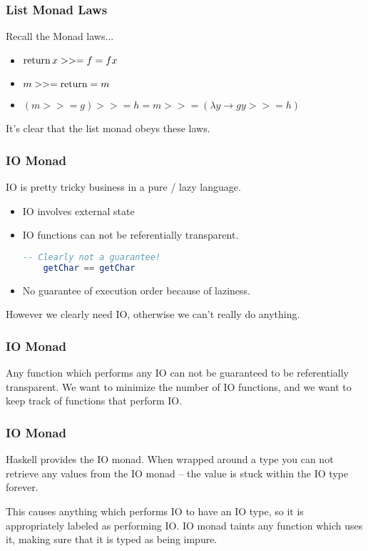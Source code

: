 \documentclass[presentation.tex]{subfiles}
\begin{document}
\begin{frame}[fragile]
  \frametitle{List Monad Laws}

  Recall the Monad laws...

  \begin{itemize}
  \item
    $\operatorname{return} x >>= f = f x$
  \item
    $m >>= \operatorname{return} = m$
  \item
    $(m >>= g) >>= h = m >>= (\lambda y \rightarrow g y >>= h)$
  \end{itemize}

  It's clear that the list monad obeys these laws.
\end{frame}

\begin{frame}[fragile]
  \frametitle{IO Monad}

  IO is pretty tricky business in a pure / lazy language.

  \begin{itemize}
  \item IO involves external state
  \item IO functions can not be referentially transparent.

  \begin{lstlisting}[frame=single,language=Haskell,breaklines=true]
    -- Clearly not a guarantee!
    getChar == getChar
  \end{lstlisting}

  \item No guarantee of execution order because of laziness.
  \end{itemize}

  However we clearly need IO, otherwise we can't really do anything.
\end{frame}

\begin{frame}[fragile]
  \frametitle{IO Monad}

  Any function which performs any IO can not be guaranteed to be
  referentially transparent. We want to minimize the number of IO
  functions, and we want to keep track of functions that perform IO.
\end{frame}

\begin{frame}[fragile]
  \frametitle{IO Monad}

  Haskell provides the IO monad. When wrapped around a type you can
  not retrieve any values from the IO monad -- the value is stuck
  within the IO type forever.

  This causes anything which performs IO to have an IO type, so it is
  appropriately labeled as performing IO. IO monad taints any function
  which uses it, making sure that it is typed as being impure.
\end{frame}
\end{document}

